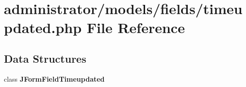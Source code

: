 \section{administrator/models/fields/timeupdated.php File Reference}
\label{administrator_2models_2fields_2timeupdated_8php}
\subsection*{Data Structures}
\begin{DoxyCompactItemize}
\item 
class \textbf{ J\+Form\+Field\+Timeupdated}
\end{DoxyCompactItemize}
